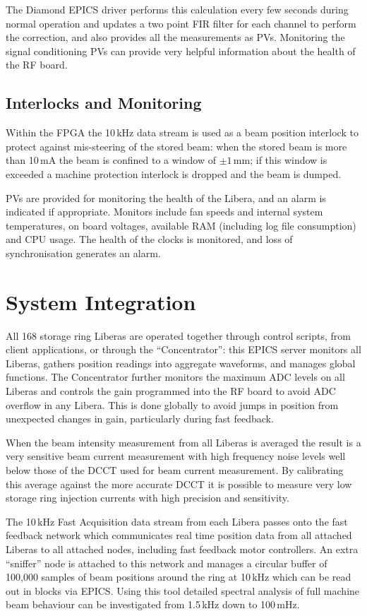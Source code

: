 \documentclass{JAC2003}
\begin{document}
The Diamond EPICS driver performs this calculation every few seconds during
normal operation and updates a two point FIR filter for each channel to
perform the correction, and also provides all the measurements as PVs.
Monitoring the signal conditioning PVs can provide very helpful information
about the health of the RF board.


\subsection{Interlocks and Monitoring}

Within the FPGA the 10\,kHz data stream is used as a beam position interlock
to protect against mis-steering of the stored beam: when the stored beam is
more than 10\,mA the beam is confined to a window of $\pm 1$\,mm; if this
window is exceeded a machine protection interlock is dropped and the beam is
dumped.

PVs are provided for monitoring the health of the Libera, and an alarm is
indicated if appropriate.  Monitors include fan speeds and internal system
temperatures, on board voltages, available RAM (including log file
consumption) and CPU usage.  The health of the clocks is monitored, and loss
of synchronisation generates an alarm.


\section{System Integration}

All 168 storage ring Liberas are operated together through control scripts,
from client applications, or through the ``Concentrator'': this EPICS server
monitors all Liberas, gathers position readings into aggregate waveforms, and
manages global functions.  The Concentrator further monitors the maximum ADC
levels on all Liberas and controls the gain programmed into the RF board to
avoid ADC overflow in any Libera.  This is done globally to avoid jumps in
position from unexpected changes in gain, particularly during fast feedback.

When the beam intensity measurement from all Liberas is averaged the result is
a very sensitive beam current measurement with high frequency noise levels
well below those of the DCCT used for beam current measurement.  By
calibrating this average against the more accurate DCCT it is possible to
measure very low storage ring injection currents with high precision and
sensitivity.

The 10\,kHz Fast Acquisition data stream from each Libera passes onto the fast
feedback network which communicates real time position data from all attached
Liberas to all attached nodes, including fast feedback motor
controllers\cite{fast-feedback}.  An extra ``sniffer'' node is attached to
this network and manages a circular buffer of 100,000 samples of beam
positions around the ring at 10\,kHz which can be read out in blocks via
EPICS.  Using this tool detailed spectral analysis of full machine beam
behaviour can be investigated from 1.5\,kHz down to 100\,mHz.
\end{document}
